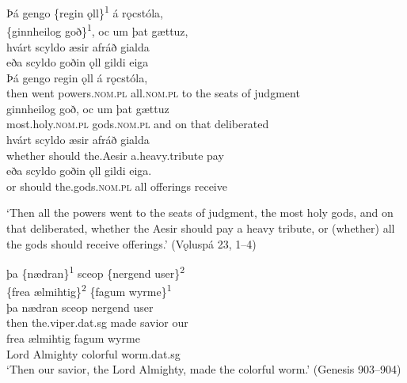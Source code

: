 \ea
{Þá gengo \{regin ǫll\}\textsuperscript{1} á rǫcstóla,}\\
{\{ginnheilog goð\}\textsuperscript{1}, oc um þat gættuz,}\\
{hvárt scyldo æsir afráð gialda}        ~\\
{eða scyldo goðin ǫll gildi eiga}      ~\\

\gll      Þá     gengo  regin         ǫll       á  rǫcstóla,\\
then  went   powers.\textsc{nom.pl}   all.\textsc{nom.pl} to  {the seats of judgment}\\

\gll ginnheilog       goð,       oc   um  þat  gættuz\\
most.holy.\textsc{nom.pl}  gods.\textsc{nom.pl}   and  on   that  deliberated\\

\gll hvárt   scyldo  æsir     afráð       gialda\\
whether  should   the.Aesir  a.heavy.tribute  pay\\

\gll eða  scyldo  goðin         ǫll   gildi    eiga.\\
or   should   the.gods.\textsc{nom.pl}   all  offerings  receive\footnotemark{}\\

\glt ‘Then all the powers went to the seats of judgment, the most holy gods, and on that deliberated, whether the Aesir should pay a heavy tribute, or (whether) all the gods should receive offerings.’ (Vǫluspá 23, 1--4)

\ex
þa \{nædran\}\textsuperscript{1} sceop  \qquad \{nergend user\}\textsuperscript{2}\\
\{frea ælmihtig\}\textsuperscript{2} \qquad \{fagum wyrme\}\textsuperscript{1}\\

\gll þa     nædran         sceop  nergend  user\\
then  the.viper.dat.sg  made  savior   our\\

\gll frea    ælmihtig  fagum  wyrme\\
Lord  Almighty  colorful   worm.dat.sg\\

\glt ‘Then our savior, the Lord Almighty, made the colorful worm.’ (Genesis 903--904)
\z
    \z

